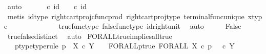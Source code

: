 \begin{isabellebody}
\ auto\isanewline
\ \ \isamarkupfalse%
\ \isamarkupfalse%
\ {\isachardoublequoteopen}{\isasymt}\ {\isasymcirc}\isactrlsub c\ id\ {\isasymone}\ {\isacharequal}{\kern0pt}\ {\isasymf}\ {\isasymcirc}\isactrlsub c\ id\ {\isasymone}{\isachardoublequoteclose}\isanewline
\ \ \ \ \isamarkupfalse%
\ {\isacharparenleft}{\kern0pt}metis\ id{\isacharunderscore}{\kern0pt}type\ right{\isacharunderscore}{\kern0pt}cart{\isacharunderscore}{\kern0pt}proj{\isacharunderscore}{\kern0pt}cfunc{\isacharunderscore}{\kern0pt}prod\ right{\isacharunderscore}{\kern0pt}cart{\isacharunderscore}{\kern0pt}proj{\isacharunderscore}{\kern0pt}type\ terminal{\isacharunderscore}{\kern0pt}func{\isacharunderscore}{\kern0pt}unique\ x{\isacharunderscore}{\kern0pt}type{\isacharparenright}{\kern0pt}\isanewline
\ \ \isamarkupfalse%
\ \isamarkupfalse%
\ {\isachardoublequoteopen}{\isasymt}\ {\isacharequal}{\kern0pt}\ {\isasymf}{\isachardoublequoteclose}\isanewline
\ \ \ \ \isamarkupfalse%
\ true{\isacharunderscore}{\kern0pt}func{\isacharunderscore}{\kern0pt}type\ false{\isacharunderscore}{\kern0pt}func{\isacharunderscore}{\kern0pt}type\ id{\isacharunderscore}{\kern0pt}right{\isacharunderscore}{\kern0pt}unit{}\ \isamarkupfalse%
\ auto\isanewline
\ \ \isamarkupfalse%
\ \isamarkupfalse%
\ False\isanewline
\ \ \ \ \isamarkupfalse%
\ true{\isacharunderscore}{\kern0pt}false{\isacharunderscore}{\kern0pt}distinct\ \isamarkupfalse%
\ auto\isanewline
{}\isamarkupfalse%
%
\endisatagproof
{\isafoldproof}%
%
\isadelimproof
\isanewline
%
\endisadelimproof
\isanewline
{}\isamarkupfalse%
\ FORALL{\isacharunderscore}{\kern0pt}true{\isacharunderscore}{\kern0pt}implies{\isacharunderscore}{\kern0pt}all{\isacharunderscore}{\kern0pt}true{}{\isacharcolon}{\kern0pt}\isanewline
\ \ \ p{\isacharunderscore}{\kern0pt}type{\isacharbrackleft}{\kern0pt}type{\isacharunderscore}{\kern0pt}rule{\isacharbrackright}{\kern0pt}{\isacharcolon}{\kern0pt}\ {\isachardoublequoteopen}p\ {\isacharcolon}{\kern0pt}\ X\ {\isasymtimes}\isactrlsub c\ Y\ {\isasymrightarrow}\ {\isasymOmega}{\isachardoublequoteclose}\ \ FORALL{\isacharunderscore}{\kern0pt}p{\isacharunderscore}{\kern0pt}true{\isacharcolon}{\kern0pt}\ {\isachardoublequoteopen}FORALL\ X\ {\isasymcirc}\isactrlsub c\ p\isactrlsup {\isasymsharp}\ {\isacharequal}{\kern0pt}\ {\isasymt}\ {\isasymcirc}\isactrlsub c\ {\isasymbeta}\isactrlbsub Y\isactrlesub {\isachardoublequoteclose}\isanewline

\end{isabellebody}
